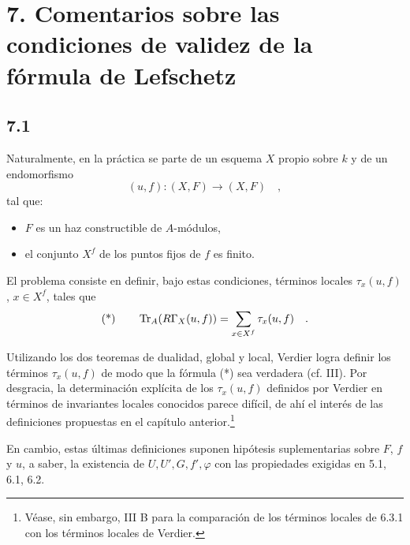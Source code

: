 \section*{7. Comentarios sobre las condiciones de validez de la fórmula de Lefschetz}

\subsection*{7.1}
Naturalmente, en la práctica se parte de un esquema $X$ propio sobre $k$ y de un endomorfismo
\[
(u, f) : (X, F) \longrightarrow (X, F) \quad ,
\]
tal que:
\begin{itemize}
\item $F$ es un haz constructible de $A$-módulos,
\item el conjunto $X^f$ de los puntos fijos de $f$ es finito.
\end{itemize}

El problema consiste en definir, bajo estas condiciones, términos locales $\tau_x(u, f)$, $x \in X^f$, tales que
\[
\text{(*)} \qquad \operatorname{Tr}_A(R\Gamma_X(u, f)) = \sum_{x \in X^f} \tau_x(u, f) \quad .
\]

Utilizando los dos teoremas de dualidad, global y local, Verdier logra definir los términos $\tau_x(u, f)$ de modo que la fórmula (*) sea verdadera (cf. III). Por desgracia, la determinación explícita de los $\tau_x(u, f)$ definidos por Verdier en términos de invariantes locales conocidos parece difícil, de ahí el interés de las definiciones propuestas en el capítulo anterior.\footnote{Véase, sin embargo, III B para la comparación de los términos locales de 6.3.1 con los términos locales de Verdier.}

En cambio, estas últimas definiciones suponen hipótesis suplementarias sobre $F$, $f$ y $u$, a saber, la existencia de $U, U', G, f', \varphi$ con las propiedades exigidas en 5.1, 6.1, 6.2.

